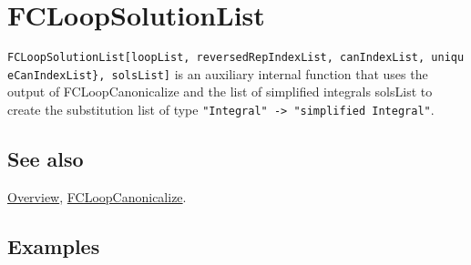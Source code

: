 \documentclass[../FeynCalcManual.tex]{subfiles}
\begin{document}
\hypertarget{fcloopsolutionlist}{
\section{FCLoopSolutionList}\label{fcloopsolutionlist}}

\texttt{FCLoopSolutionList[\allowbreak{}loopList,\ \allowbreak{}reversedRepIndexList,\ \allowbreak{}canIndexList,\ \allowbreak{}uniqueCanIndexList\},\ \allowbreak{}solsList]}
is an auxiliary internal function that uses the output of
FCLoopCanonicalize and the list of simplified integrals solsList to
create the substitution list of type
\texttt{"Integral" -> "simplified Integral"}.

\subsection{See also}

\hyperlink{toc}{Overview},
\hyperlink{fcloopcanonicalize}{FCLoopCanonicalize}.

\subsection{Examples}

\begin{Shaded}
\begin{Highlighting}[]
\ExtensionTok{=}\OperatorTok{[}\OperatorTok{[}\OperatorTok{[}\OperatorTok{,} \SpecialCharTok{\textbackslash{}}\OperatorTok{[}\OperatorTok{]]}\OperatorTok{[}\OperatorTok{,} \SpecialCharTok{\textbackslash{}}\OperatorTok{[}\OperatorTok{]]}\OperatorTok{[}\OperatorTok{,} \OperatorTok{\{} \SpecialCharTok{+} \OperatorTok{,} \OperatorTok{\}]]} \SpecialCharTok{+}\OperatorTok{[}\OperatorTok{[}\OperatorTok{,} \SpecialCharTok{\textbackslash{}}\OperatorTok{[}\OperatorTok{]]}\OperatorTok{[}\OperatorTok{,} \SpecialCharTok{\textbackslash{}}\OperatorTok{[}\OperatorTok{]]}\OperatorTok{[}\OperatorTok{,} \OperatorTok{\{} \SpecialCharTok{+} \OperatorTok{,} \OperatorTok{\}]],} \OperatorTok{,}\OperatorTok{]} 
\end{Highlighting}
\end{Shaded}
\end{document}
